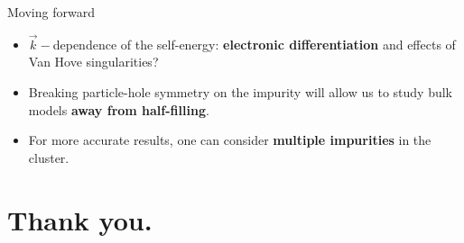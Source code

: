 \documentclass[10pt,aspectratio=169]{beamer}
\newcommand{\focus}[1]{\textcolor{lblue}{\textbf{#1}}}
\begin{document}
\begin{frame}[noframenumbering]{Moving forward}
\begin{itemize}[<+->]
	\item \(\vec k-\)dependence of the self-energy: \focus{electronic differentiation} and effects of Van Hove singularities?
	\item Breaking particle-hole symmetry on the impurity will allow us to study bulk models \focus{away from half-filling}.
	\item For more accurate results, one can consider \focus{multiple impurities} in the cluster.
\end{itemize}
\end{frame}

\section{Thank you.}
\end{document}
